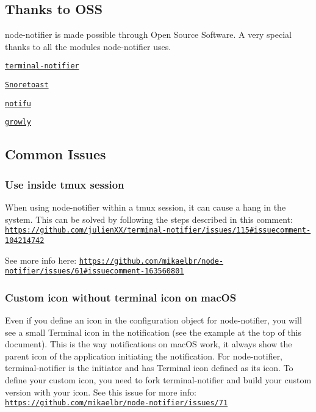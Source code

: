 \subsection*{Thanks to O\+SS}

{\ttfamily node-\/notifier} is made possible through Open Source Software. A very special thanks to all the modules {\ttfamily node-\/notifier} uses.
\begin{DoxyItemize}
\item \href{https://github.com/julienXX/terminal-notifier}{\tt terminal-\/notifier}
\item \href{https://github.com/KDE/snoretoast}{\tt Snoretoast}
\item \href{http://www.paralint.com/projects/notifu/}{\tt notifu}
\item \href{https://github.com/theabraham/growly/}{\tt growly}
\end{DoxyItemize}

\href{https://npmjs.org/package/node-notifier}{\tt }

\subsection*{Common Issues}

\subsubsection*{Use inside tmux session}

When using node-\/notifier within a tmux session, it can cause a hang in the system. This can be solved by following the steps described in this comment\+: \href{https://github.com/julienXX/terminal-notifier/issues/115#issuecomment-104214742}{\tt https\+://github.\+com/julien\+X\+X/terminal-\/notifier/issues/115\#issuecomment-\/104214742}

See more info here\+: \href{https://github.com/mikaelbr/node-notifier/issues/61#issuecomment-163560801}{\tt https\+://github.\+com/mikaelbr/node-\/notifier/issues/61\#issuecomment-\/163560801}

\subsubsection*{Custom icon without terminal icon on mac\+OS}

Even if you define an icon in the configuration object for {\ttfamily node-\/notifier}, you will see a small Terminal icon in the notification (see the example at the top of this document). This is the way notifications on mac\+OS work, it always show the parent icon of the application initiating the notification. For node-\/notifier, terminal-\/notifier is the initiator and has Terminal icon defined as its icon. To define your custom icon, you need to fork terminal-\/notifier and build your custom version with your icon. See this issue for more info\+: \href{https://github.com/mikaelbr/node-notifier/issues/71}{\tt https\+://github.\+com/mikaelbr/node-\/notifier/issues/71}

